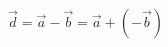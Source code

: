 \documentclass[preview]{standalone}
\begin{document}
\begin{align*}
\vec{d}=\vec{a}-\vec{b}=\vec{a}+(-\vec{b})
\end{align*}
\end{document}
